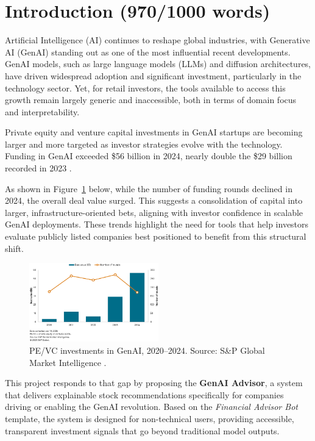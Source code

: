 \section{Introduction (970/1000 words)}

Artificial Intelligence (AI) continues to reshape global industries, with Generative AI (GenAI) standing out as one of the most influential recent developments. GenAI models, such as large language models (LLMs) and diffusion architectures, have driven widespread adoption and significant investment, particularly in the technology sector. Yet, for retail investors, the tools available to access this growth remain largely generic and inaccessible, both in terms of domain focus and interpretability.

Private equity and venture capital investments in GenAI startups are becoming larger and more targeted as investor strategies evolve with the technology. Funding in GenAI exceeded \$56 billion in 2024, nearly double the \$29 billion recorded in 2023 \cite{spglobal2025}.

As shown in Figure~\ref{fig:genai-investment} below, while the number of funding rounds declined in 2024, the overall deal value surged. This suggests a consolidation of capital into larger, infrastructure-oriented bets, aligning with investor confidence in scalable GenAI deployments. These trends highlight the need for tools that help investors evaluate publicly listed companies best positioned to benefit from this structural shift.

\begin{figure}[h]
    \centering
    \includegraphics[width=0.5\textwidth]{assets/investGenAI.png}
    \caption{\small PE/VC investments in GenAI, 2020–2024. Source: S\&P Global Market Intelligence \cite{spglobal2025}.}
    \label{fig:genai-investment}
\end{figure}

This project responds to that gap by proposing the \textbf{GenAI Advisor}, a system that delivers explainable stock recommendations specifically for companies driving or enabling the GenAI revolution. Based on the \textit{Financial Advisor Bot} template, the system is designed for non-technical users, providing accessible, transparent investment signals that go beyond traditional model outputs.

